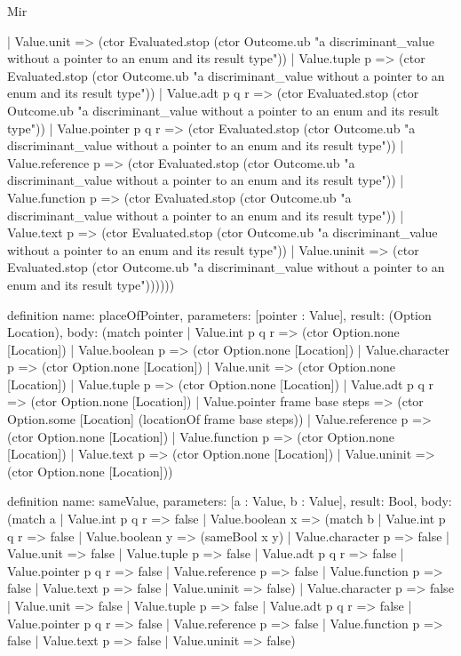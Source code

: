 \begin{lexlean}{Mir}
\begin{semanticmodule}
{          | Value.unit => (ctor Evaluated.stop (ctor Outcome.ub "a discriminant_value without a pointer to an enum and its result type"))
          | Value.tuple p => (ctor Evaluated.stop (ctor Outcome.ub "a discriminant_value without a pointer to an enum and its result type"))
          | Value.adt p q r => (ctor Evaluated.stop (ctor Outcome.ub "a discriminant_value without a pointer to an enum and its result type"))
          | Value.pointer p q r => (ctor Evaluated.stop (ctor Outcome.ub "a discriminant_value without a pointer to an enum and its result type"))
          | Value.reference p => (ctor Evaluated.stop (ctor Outcome.ub "a discriminant_value without a pointer to an enum and its result type"))
          | Value.function p => (ctor Evaluated.stop (ctor Outcome.ub "a discriminant_value without a pointer to an enum and its result type"))
          | Value.text p => (ctor Evaluated.stop (ctor Outcome.ub "a discriminant_value without a pointer to an enum and its result type"))
          | Value.uninit => (ctor Evaluated.stop (ctor Outcome.ub "a discriminant_value without a pointer to an enum and its result type"))))))
}

definition{
  name: placeOfPointer,
  parameters: [pointer : Value],
  result: (Option Location),
  body: (match pointer
    | Value.int p q r => (ctor Option.none [Location])
    | Value.boolean p => (ctor Option.none [Location])
    | Value.character p => (ctor Option.none [Location])
    | Value.unit => (ctor Option.none [Location])
    | Value.tuple p => (ctor Option.none [Location])
    | Value.adt p q r => (ctor Option.none [Location])
    | Value.pointer frame base steps => (ctor Option.some [Location] (locationOf frame base steps))
    | Value.reference p => (ctor Option.none [Location])
    | Value.function p => (ctor Option.none [Location])
    | Value.text p => (ctor Option.none [Location])
    | Value.uninit => (ctor Option.none [Location]))
}

definition{
  name: sameValue,
  parameters: [a : Value, b : Value],
  result: Bool,
  body: (match a
    | Value.int p q r => false
    | Value.boolean x => (match b
      | Value.int p q r => false
      | Value.boolean y => (sameBool x y)
      | Value.character p => false
      | Value.unit => false
      | Value.tuple p => false
      | Value.adt p q r => false
      | Value.pointer p q r => false
      | Value.reference p => false
      | Value.function p => false
      | Value.text p => false
      | Value.uninit => false)
    | Value.character p => false
    | Value.unit => false
    | Value.tuple p => false
    | Value.adt p q r => false
    | Value.pointer p q r => false
    | Value.reference p => false
    | Value.function p => false
    | Value.text p => false
    | Value.uninit => false)
}


\end{semanticmodule}
\end{lexlean}
